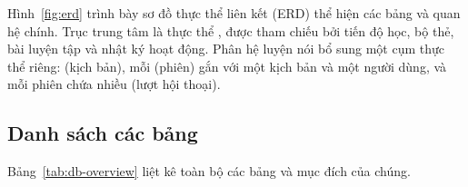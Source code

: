 Hình~\ref{fig:erd} trình bày sơ đồ thực thể liên kết (ERD) thể hiện các bảng
và quan hệ chính. Trục trung tâm là thực thể , được tham
chiếu bởi tiến độ học, bộ thẻ, bài luyện tập và nhật ký hoạt động. Phân hệ
luyện nói bổ sung một cụm thực thể riêng:  (kịch bản), mỗi
 (phiên) gắn với một kịch bản và một người dùng, và
mỗi phiên chứa nhiều  (lượt hội thoại).


\subsection{Danh sách các bảng}
\label{subsec:danh-sach-bang}

Bảng~\ref{tab:db-overview} liệt kê toàn bộ các bảng và mục đích của chúng.

